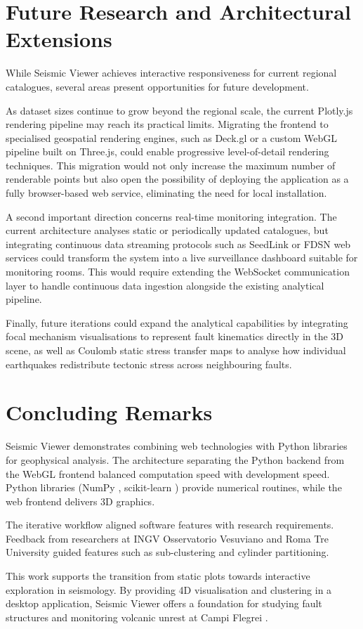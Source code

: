 \section{Future Research and Architectural Extensions}
\label{sec:future-work}

While Seismic Viewer achieves interactive responsiveness for current regional catalogues, several areas present opportunities for future development.

As dataset sizes continue to grow beyond the regional scale, the current Plotly.js \cite{plotlyjs} rendering pipeline may reach its practical limits. Migrating the frontend to specialised geospatial rendering engines, such as Deck.gl or a custom WebGL pipeline built on Three.js, could enable progressive level-of-detail rendering techniques. This migration would not only increase the maximum number of renderable points but also open the possibility of deploying the application as a fully browser-based web service, eliminating the need for local installation.

A second important direction concerns real-time monitoring integration. The current architecture analyses static or periodically updated catalogues, but integrating continuous data streaming protocols such as SeedLink or FDSN web services could transform the system into a live surveillance dashboard suitable for monitoring rooms. This would require extending the WebSocket communication layer to handle continuous data ingestion alongside the existing analytical pipeline.

Finally, future iterations could expand the analytical capabilities by integrating focal mechanism visualisations to represent fault kinematics directly in the 3D scene, as well as Coulomb static stress transfer maps to analyse how individual earthquakes redistribute tectonic stress across neighbouring faults.

\section{Concluding Remarks}
\label{sec:concluding}

Seismic Viewer demonstrates combining web technologies with Python libraries for geophysical analysis. The architecture separating the Python backend from the WebGL frontend balanced computation speed with development speed. Python libraries (NumPy \cite{numpy2020}, scikit-learn \cite{pedregosa2011sklearn}) provide numerical routines, while the web frontend delivers 3D graphics.

The iterative workflow aligned software features with research requirements. Feedback from researchers at INGV Osservatorio Vesuviano and Roma Tre University guided features such as sub-clustering and cylinder partitioning.

This work supports the transition from static plots towards interactive exploration in seismology. By providing 4D visualisation and clustering in a desktop application, Seismic Viewer offers a foundation for studying fault structures and monitoring volcanic unrest at Campi Flegrei \cite{desiena2017bradyseism, giordano2025birth}.
